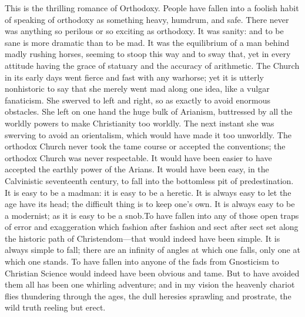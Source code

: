 \documentclass{book}
\begin{document}
This is the thrilling romance of Orthodoxy. People have fallen into a foolish habit of speaking of orthodoxy as something heavy, humdrum, and safe. There never was anything so perilous or so exciting as orthodoxy. It was sanity: and to be sane is more dramatic than to be mad. It was the equilibrium of a man behind madly rushing horses, seeming to stoop this way and to sway that, yet in every attitude having the grace of statuary and the accuracy of arithmetic. The Church in its early days went fierce and fast with any warhorse; yet it is utterly nonhistoric to say that she merely went mad along one idea, like a vulgar fanaticism. She swerved to left and right, so as exactly to avoid enormous obstacles. She left on one hand the huge bulk of Arianism, buttressed by all the worldly powers to make Christianity too worldly. The next instant she was swerving to avoid an orientalism, which would have made it too unworldly. The orthodox Church never took the tame course or accepted the conventions; the orthodox Church was never respectable. It would have been easier to have accepted the earthly power of the Arians. It would have been easy, in the Calvinistic seventeenth century, to fall into the bottomless pit of predestination. It is easy to be a madman: it is easy to be a heretic. It is always easy to let the age have its head; the difficult thing is to keep one’s own. It is always easy to be a modernist; as it is easy to be a snob.To have fallen into any of those open traps of error and exaggeration which fashion after fashion and sect after sect set along the historic path of Christendom—that would indeed have been simple. It is always simple to fall; there are an infinity of angles at which one falls, only one at which one stands. To have fallen into anyone of the fads from Gnosticism to Christian Science would indeed have been obvious and tame. But to have avoided them all has been one whirling adventure; and in my vision the heavenly chariot flies thundering through the ages, the dull heresies sprawling and prostrate, the wild truth reeling but erect.
\end{document}
